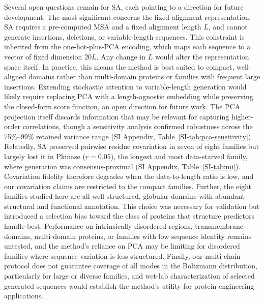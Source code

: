 \documentclass[11pt,onecolumn,twoside,lineno]{pnas-new}
\begin{document}
Several open questions remain for SA, each pointing to a direction for future development. The most significant concerns the fixed alignment representation: SA requires a pre-computed MSA and a fixed alignment length $L$, and cannot generate insertions, deletions, or variable-length sequences. This constraint is inherited from the one-hot-plus-PCA encoding, which maps each sequence to a vector of fixed dimension $20L$. Any change in $L$ would alter the representation space itself. In practice, this means the method is best suited to compact, well-aligned domains rather than multi-domain proteins or families with frequent large insertions. Extending stochastic attention to variable-length generation would likely require replacing PCA with a length-agnostic embedding while preserving the closed-form score function, an open direction for future work. The PCA projection itself discards information that may be relevant for capturing higher-order correlations, though a sensitivity analysis confirmed robustness across the 75\%--99\% retained variance range (SI Appendix, Table~\ref{SI-tab:pca-sensitivity}). Relatedly, SA preserved pairwise residue covariation in seven of eight families but largely lost it in Pkinase ($r{=}0.05$), the longest and most data-starved family, where generation was consensus-proximal (SI Appendix, Table~\ref{SI-tab:mi}). Covariation fidelity therefore degrades when the data-to-length ratio is low, and our covariation claims are restricted to the compact families. Further, the eight families studied here are all well-structured, globular domains with abundant structural and functional annotation. This choice was necessary for validation but introduced a selection bias toward the class of proteins that structure predictors handle best. Performance on intrinsically disordered regions, transmembrane domains, multi-domain proteins, or families with low sequence identity remains untested, and the method's reliance on PCA may be limiting for disordered families where sequence variation is less structured. Finally, our multi-chain protocol does not guarantee coverage of all modes in the Boltzmann distribution, particularly for large or diverse families, and wet-lab characterization of selected generated sequences would establish the method's utility for protein engineering applications.
\end{document}
